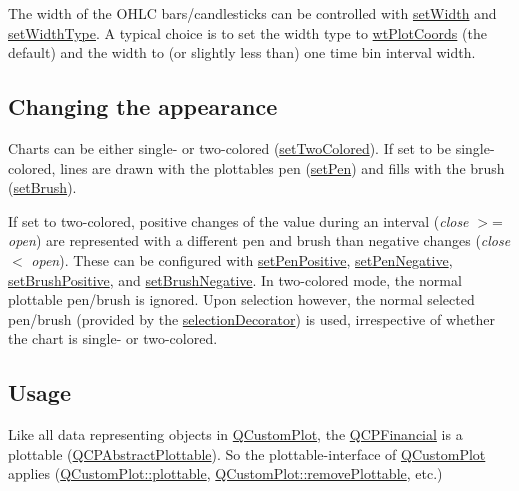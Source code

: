 The width of the O\+H\+LC bars/candlesticks can be controlled with \hyperlink{classQCPFinancial_a99633f8bac86a61d534ae5eeb1a3068f}{set\+Width} and \hyperlink{classQCPFinancial_a204b7b710352796593a432b723e34089}{set\+Width\+Type}. A typical choice is to set the width type to \hyperlink{classQCPFinancial_aef1761dda71a53dc5269685e9e492626af676bc8dbe700b96b333329c9dbfc30f}{wt\+Plot\+Coords} (the default) and the width to (or slightly less than) one time bin interval width.\hypertarget{classQCPFinancial_qcpfinancial-appearance}{}\subsection{Changing the appearance}\label{classQCPFinancial_qcpfinancial-appearance}
Charts can be either single-\/ or two-\/colored (\hyperlink{classQCPFinancial_a138e44aac160a17a9676652e240c5f08}{set\+Two\+Colored}). If set to be single-\/colored, lines are drawn with the plottable\textquotesingle{}s pen (\hyperlink{classQCPAbstractPlottable_ab74b09ae4c0e7e13142fe4b5bf46cac7}{set\+Pen}) and fills with the brush (\hyperlink{classQCPAbstractPlottable_a7a4b92144dca6453a1f0f210e27edc74}{set\+Brush}).

If set to two-\/colored, positive changes of the value during an interval ({\itshape close} $>$= {\itshape open}) are represented with a different pen and brush than negative changes ({\itshape close} $<$ {\itshape open}). These can be configured with \hyperlink{classQCPFinancial_ac58aa3adc7a35aab0088764b840683e5}{set\+Pen\+Positive}, \hyperlink{classQCPFinancial_afe5c07e94ccea01a75b3a2476993c346}{set\+Pen\+Negative}, \hyperlink{classQCPFinancial_a5ebff2b1764efd07cc44942e67821829}{set\+Brush\+Positive}, and \hyperlink{classQCPFinancial_a8bbdd87629f9144b3ef51af660c0961a}{set\+Brush\+Negative}. In two-\/colored mode, the normal plottable pen/brush is ignored. Upon selection however, the normal selected pen/brush (provided by the \hyperlink{classQCPAbstractPlottable_a7861518e47ca0c6a0c386032c2db075e}{selection\+Decorator}) is used, irrespective of whether the chart is single-\/ or two-\/colored.\hypertarget{classQCPFinancial_qcpfinancial-usage}{}\subsection{Usage}\label{classQCPFinancial_qcpfinancial-usage}
Like all data representing objects in \hyperlink{classQCustomPlot}{Q\+Custom\+Plot}, the \hyperlink{classQCPFinancial}{Q\+C\+P\+Financial} is a plottable (\hyperlink{classQCPAbstractPlottable}{Q\+C\+P\+Abstract\+Plottable}). So the plottable-\/interface of \hyperlink{classQCustomPlot}{Q\+Custom\+Plot} applies (\hyperlink{classQCustomPlot_a32de81ff53e263e785b83b52ecd99d6f}{Q\+Custom\+Plot\+::plottable}, \hyperlink{classQCustomPlot_af3dafd56884208474f311d6226513ab2}{Q\+Custom\+Plot\+::remove\+Plottable}, etc.)

